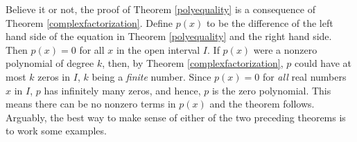 \documentclass{ximera}
\begin{document}
\smallskip

Believe it or not, the proof of Theorem \ref{polyequality} is a consequence of Theorem \ref{complexfactorization}.  Define $p(x)$ to be the difference of the left hand side of the equation in Theorem \ref{polyequality} and the right hand side.  Then $p(x) = 0$ for all $x$ in the open interval $I$.  If $p(x)$ were a nonzero polynomial of degree $k$, then, by Theorem \ref{complexfactorization}, $p$ could have at most $k$ zeros in $I$, $k$ being a \textit{finite} number.  Since $p(x) = 0$ for \textit{all} real numbers $x$ in $I$, $p$ has infinitely many zeros, and hence, $p$ is the zero polynomial.  This means there can be no nonzero terms in $p(x)$ and the theorem follows.  Arguably, the best way to make sense of either of the two preceding theorems is to work some examples.  
\end{document}
